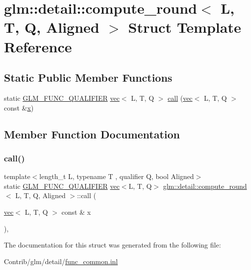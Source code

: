 \hypertarget{structglm_1_1detail_1_1compute__round}{}\section{glm\+:\+:detail\+:\+:compute\+\_\+round$<$ L, T, Q, Aligned $>$ Struct Template Reference}
\label{structglm_1_1detail_1_1compute__round}
\subsection*{Static Public Member Functions}
\begin{DoxyCompactItemize}
\item 
static \mbox{\hyperlink{setup_8hpp_a33fdea6f91c5f834105f7415e2a64407}{G\+L\+M\+\_\+\+F\+U\+N\+C\+\_\+\+Q\+U\+A\+L\+I\+F\+I\+ER}} \mbox{\hyperlink{structglm_1_1vec}{vec}}$<$ L, T, Q $>$ \mbox{\hyperlink{structglm_1_1detail_1_1compute__round_a25a3c9a2b89285f11c983227f3e73956}{call}} (\mbox{\hyperlink{structglm_1_1vec}{vec}}$<$ L, T, Q $>$ const \&\mbox{\hyperlink{_s_d_l__opengl_8h_ad0e63d0edcdbd3d79554076bf309fd47}{x}})
\end{DoxyCompactItemize}


\subsection{Member Function Documentation}
\mbox{\label{structglm_1_1detail_1_1compute__round_a25a3c9a2b89285f11c983227f3e73956}} 
\subsubsection{\texorpdfstring{call()}{call()}}
{\footnotesize\ttfamily template$<$length\+\_\+t L, typename T , qualifier Q, bool Aligned$>$ \\
static \mbox{\hyperlink{setup_8hpp_a33fdea6f91c5f834105f7415e2a64407}{G\+L\+M\+\_\+\+F\+U\+N\+C\+\_\+\+Q\+U\+A\+L\+I\+F\+I\+ER}} \mbox{\hyperlink{structglm_1_1vec}{vec}}$<$L, T, Q$>$ \mbox{\hyperlink{structglm_1_1detail_1_1compute__round}{glm\+::detail\+::compute\+\_\+round}}$<$ L, T, Q, Aligned $>$\+::call (\begin{DoxyParamCaption}\item[{\mbox{\hyperlink{structglm_1_1vec}{vec}}$<$ L, T, Q $>$ const \&}]{x }\end{DoxyParamCaption})\hspace{0.3cm}{\ttfamily [inline]}, {\ttfamily [static]}}



The documentation for this struct was generated from the following file\+:\begin{DoxyCompactItemize}
\item 
Contrib/glm/detail/\mbox{\hyperlink{func__common_8inl}{func\+\_\+common.\+inl}}\end{DoxyCompactItemize}
